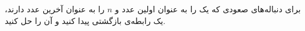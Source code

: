 \EXERCISE
برای دنباله‌های صعودی که یک را به عنوان اولین عدد و
$n$
را به عنوان آخرین عدد دارند، یک رابطه‌ی بازگشتی پیدا کنید و آن را حل کنید.